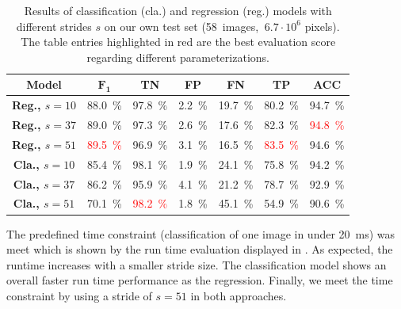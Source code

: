 \begin{table}[]
    \begin{center}
        \begin{tabular}{c|cccccc}
            \toprule
            \textbf{Model} & {\bf $\mathbf{F_1}$} & \textbf{TN} & \textbf{FP} & \textbf{FN} & \textbf{TP} & \textbf{ACC} \\
            \midrule
            \textbf{Reg., $s=10$} & \SI{88.0}{\percent} & \SI{97.8}{\percent} & \SI{2.2}{\percent}& \SI{19.7}{\percent}& \SI{80.2}{\percent}& \SI{94.7}{\percent}\\
            \textbf{Reg., $s=37$} & \SI{89.0}{\percent}& \SI{97.3}{\percent}& \SI{2.6}{\percent}& \SI{17.6}{\percent}& \SI{82.3}{\percent} &  \textcolor{red}{\SI{94.8}{\percent}}\\
            \textbf{Reg., $s=51$} & \textcolor{red}{\SI{89.5}{\percent}} &\SI{96.9}{\percent} & \SI{3.1}{\percent} & \SI{16.5}{\percent}& \textcolor{red}{\SI{83.5}{\percent}} & \SI{94.6}{\percent}\\
            \midrule
            \textbf{Cla., $s=10$} & \SI{85.4}{\percent} & \SI{98.1}{\percent}& \SI{1.9}{\percent}&\SI{24.1}{\percent} & \SI{75.8}{\percent} & \SI{94.2}{\percent}\\
            \textbf{Cla., $s=37$} & \SI{86.2}{\percent}& \SI{95.9}{\percent} & \SI{4.1}{\percent} & \SI{21.2}{\percent} & \SI{78.7}{\percent} & \SI{92.9}{\percent}\\
            \textbf{Cla., $s=51$} & \SI{70.1}{\percent} & \textcolor{red}{\SI{98.2}{\percent}} & \SI{1.8}{\percent} & \SI{45.1}{\percent} & \SI{54.9}{\percent} & \SI{90.6}{\percent}\\
            \bottomrule
        \end{tabular}
        \caption{Results of classification (cla.) and regression (reg.) models
                 with different strides $s$ on our own test set (58~images,
                 $ ~6.7 \cdot 10^6$ pixels). The table entries highlighted in
                 red are the best evaluation score regarding different parameterizations.}
        \label{tab:ownapproach}
    \end{center}
\end{table}



The predefined time constraint (classification of
one image in under \SI{20}{\milli\second}) was meet which is shown by the run time evaluation
displayed in . As expected, the runtime increases with a
smaller stride size. The classification model shows an overall faster run time
performance as the regression. Finally, we meet the time constraint
by using a stride of $s=51$ in both approaches.

